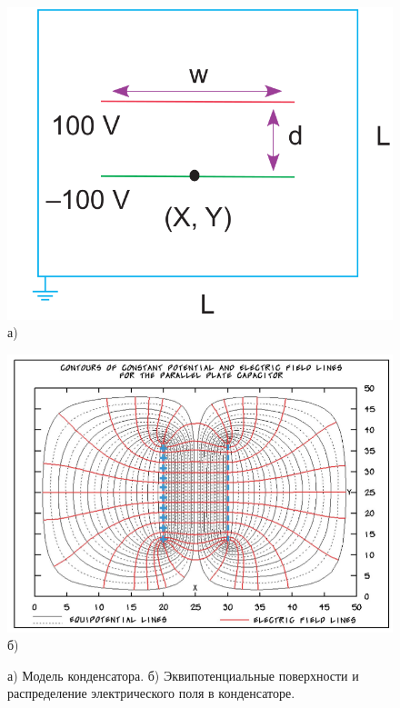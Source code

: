 \documentclass[12pt]{article}
\begin{document}
\begin{figure}
\begin{minipage}{0.49\linewidth}
\begin{center}
\includegraphics[width=0.9\linewidth]{./figs/04.png}\\
а)
\end{center}
\end{minipage}
\begin{minipage}{0.49\linewidth}
\begin{center}
\includegraphics[width=\linewidth]{./figs/05.png}\\
б)
\end{center}
\end{minipage}
\caption{а) Модель конденсатора. б) Эквипотенциальные поверхности и распределение электрического поля в конденсаторе.}
\label{fig:capacitor}
\end{figure}
\end{document}
